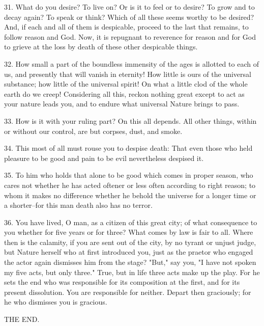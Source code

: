 \documentclass{book}
\begin{document}
31. What do you desire? To live on? Or is it to feel or to desire? To
grow and to decay again? To speak or think? Which of all these seems
worthy to be desired? And, if each and all of them is despicable,
proceed to the last that remains, to follow reason and God. Now, it is
repugnant to reverence for reason and for God to grieve at the loss by
death of these other despicable things.

32. How small a part of the boundless immensity of the ages is
allotted to each of us, and presently that will vanish in eternity!
How little is ours of the universal substance; how little of the
universal spirit!  On what a little clod of the whole earth do we
creep! Considering all this, reckon nothing great except to act as
your nature leads you, and to endure what universal Nature brings to
pass.

33. How is it with your ruling part? On this all depends. All other
things, within or without our control, are but corpses, dust, and
smoke.

34. This most of all must rouse you to despise death: That even those
who held pleasure to be good and pain to be evil nevertheless despised
it.

35. To him who holds that alone to be good which comes in proper
season, who cares not whether he has acted oftener or less often
according to right reason; to whom it makes no difference whether he
behold the universe for a longer time or a shorter--for this man
death also has no terror.

36. You have lived, O man, as a citizen of this great city; of what
consequence to you whether for five years or for three? What comes by
law is fair to all. Where then is the calamity, if you are sent out of
the city, by no tyrant or unjust judge, but Nature herself who at
first introduced you, just as the praetor who engaged the actor again
dismisses him from the stage? "But," say you, "I have not spoken my
five acts, but only three." True, but in life three acts make up the
play. For he sets the end who was responsible for its composition at
the first, and for its present dissolution. You are responsible for
neither. Depart then graciously; for he who dismisses you is gracious.

\begin{center}THE END.\end{center}

\backmatter
\end{document}
